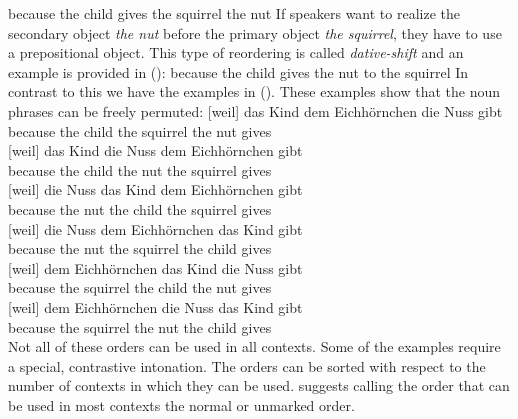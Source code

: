 \ea
because the child gives the squirrel the nut 
\z
If speakers want to realize the secondary object \emph{the nut} before the primary object \emph{the
  squirrel}, they have to use a prepositional object. This type of reordering is called
\emph{dative-shift} and an example is provided in ():
\ea
because the child gives the nut to the squirrel 
\z
In contrast to this we have the  examples in (). These examples show that the noun
phrases can be freely permuted:
\eal
\ex 
\gll {}[weil]          das Kind dem Eichhörnchen die Nuss gibt\\
     \spacebr{}because the child the squirrel the nut gives\\
\ex 
\gll {}[weil]          das Kind die Nuss dem Eichhörnchen  gibt\\
     \spacebr{}because the child  the nut the squirrel gives\\
\ex 
\gll {}[weil]          die Nuss das Kind dem Eichhörnchen  gibt\\
     \spacebr{}because the nut the child  the squirrel gives\\
\ex 
\gll {}[weil]          die Nuss dem Eichhörnchen  das Kind gibt\\
     \spacebr{}because the nut the squirrel the child  gives\\
\ex 
\gll {}[weil]          dem Eichhörnchen  das Kind die Nuss gibt\\
     \spacebr{}because the squirrel the child  the nut gives\\
\ex 
\gll {}[weil]          dem Eichhörnchen  die Nuss das Kind gibt\\
     \spacebr{}because the squirrel the nut the child  gives\\
\zl
Not all of these orders can be used in all contexts. Some of the examples require a special,
contrastive intonation. The orders can be sorted with respect to the number of contexts in which
they can be used. \citet{Hoehle82a} suggests calling the order that can be used in most contexts the
normal or unmarked order.

